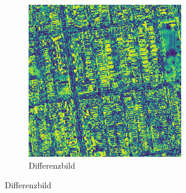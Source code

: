 \begin{figure}[ht]
\begin{subfigure}[t]{.14\textwidth}
  \end{subfigure}
  \begin{subfigure}[t]{.14\textwidth}
    \centering
    \caption*{Differenzbild}
    \includegraphics[width=\linewidth]{images/cycleGanResults/Satelite2_diff.png}
  \end{subfigure}

  \medskip


\end{figure}

